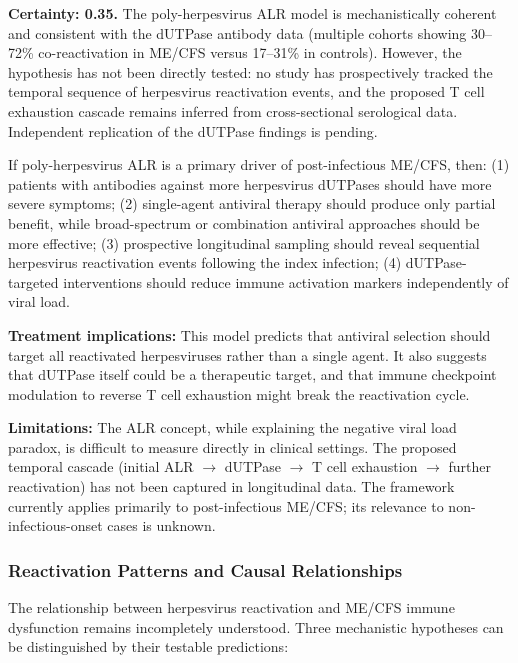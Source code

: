 \begin{speculation}
\label{spec:poly-herpesvirus-alr}

\textbf{Certainty: 0.35.} The poly-herpesvirus ALR model is mechanistically coherent and consistent with the dUTPase antibody data (multiple cohorts showing 30--72\% co-reactivation in ME/CFS versus 17--31\% in controls). However, the hypothesis has not been directly tested: no study has prospectively tracked the temporal sequence of herpesvirus reactivation events, and the proposed T cell exhaustion cascade remains inferred from cross-sectional serological data. Independent replication of the dUTPase findings is pending.

If poly-herpesvirus ALR is a primary driver of post-infectious ME/CFS, then: (1) patients with antibodies against more herpesvirus dUTPases should have more severe symptoms; (2) single-agent antiviral therapy should produce only partial benefit, while broad-spectrum or combination antiviral approaches should be more effective; (3) prospective longitudinal sampling should reveal sequential herpesvirus reactivation events following the index infection; (4) dUTPase-targeted interventions should reduce immune activation markers independently of viral load.

\textbf{Treatment implications:} This model predicts that antiviral selection should target all reactivated herpesviruses rather than a single agent. It also suggests that dUTPase itself could be a therapeutic target, and that immune checkpoint modulation to reverse T cell exhaustion might break the reactivation cycle.

\textbf{Limitations:} The ALR concept, while explaining the negative viral load paradox, is difficult to measure directly in clinical settings. The proposed temporal cascade (initial ALR $\rightarrow$ dUTPase $\rightarrow$ T cell exhaustion $\rightarrow$ further reactivation) has not been captured in longitudinal data. The framework currently applies primarily to post-infectious ME/CFS; its relevance to non-infectious-onset cases is unknown.
\end{speculation}

\subsubsection{Reactivation Patterns and Causal Relationships}

The relationship between herpesvirus reactivation and ME/CFS immune dysfunction remains incompletely understood. Three mechanistic hypotheses can be distinguished by their testable predictions:

